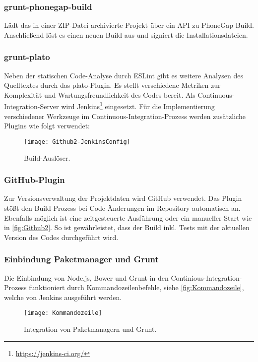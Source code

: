 \subsubsection{grunt-phonegap-build}
Lädt das in einer ZIP-Datei archivierte Projekt über ein \ac{API} zu PhoneGap Build. Anschließend löst es einen neuen Build aus und signiert die Installationsdateien.

\subsubsection{grunt-plato}
Neben der statischen Code-Analyse durch ESLint gibt es weitere Analysen des Quelltextes durch das plato-Plugin. Es stellt verschiedene Metriken zur Komplexität und Wartungsfreundlichkeit des Codes bereit.
\SuperPar
\SuperPar
{}
Als Continuous-Integration-Server wird Jenkins\footnote{\url{https://jenkins-ci.org/}} eingesetzt. Für die Implementierung verschiedener Werkzeuge im Continuous-Integration-Prozess werden zusätzliche Plugins wie folgt verwendet:

\begin{figure}[h]
\centering
\texttt{[image: Github2-JenkinsConfig]}
\caption[Build-Auslöser]{Build-Auslöser.}
\label{fig:Github2}
\end{figure}

\subsubsection{GitHub-Plugin}Zur Versionsverwaltung der Projektdaten wird GitHub verwendet. Das Plugin stößt den Build-Prozess bei Code-Änderungen im Repository automatisch an. Ebenfalls möglich ist eine zeitgesteuerte Ausführung oder ein manueller Start wie in \autoref{fig:Github2}. So ist gewährleistet, dass der Build inkl. Tests mit der aktuellen Version des Codes durchgeführt wird.

\subsubsection{Einbindung Paketmanager und Grunt}
Die Einbindung von Node.js, Bower und Grunt in den Continious-Integration-Prozess funktioniert durch Kommandozeilenbefehle, siehe \autoref{fig:Kommandozeile}, welche von Jenkins ausgeführt werden.

\begin{figure}[h]
\centering
\texttt{[image: Kommandozeile]}
\caption[Integration von Paketmanagern und Grunt]{Integration von Paketmanagern und Grunt.}
\label{fig:Kommandozeile}
\end{figure}


